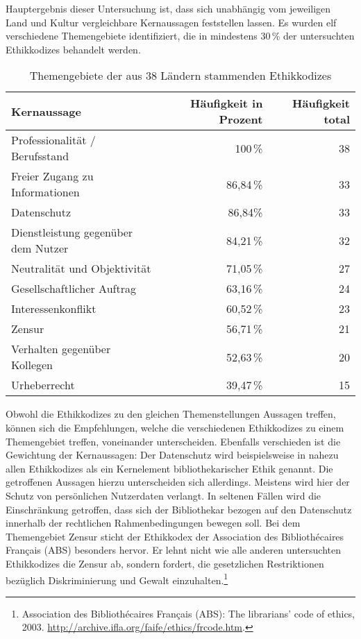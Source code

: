 \documentclass[output=paper]{langscibook}
\begin{document}
Hauptergebnis dieser Untersuchung ist, dass sich unabhängig vom
jeweiligen Land und Kultur vergleichbare Kernaussagen feststellen
lassen. Es wurden elf verschiedene Themengebiete identifiziert, die in
mindestens 30\,\% der untersuchten Ethikkodizes behandelt werden.



\begin{table}[htp!]
\centering
\begin{tabularx}{\textwidth}{@{} X r r @{}}
\toprule
\textbf{Kernaussage}  & \textbf{Häufigkeit in Prozent}  & \textbf{Häufigkeit total} \\
\midrule
Professionalität / Berufsstand & 100\,\% & 38 \\
\midrule
Freier Zugang zu Informationen & 86,84\,\% & 33 \\
\midrule
Datenschutz & 86,84\% & 33 \\
\midrule
Dienstleistung gegenüber dem Nutzer & 84,21\,\% & 32 \\
\midrule
Neutralität und Objektivität & 71,05\,\% & 27 \\
\midrule
Gesellschaftlicher Auftrag & 63,16\,\% & 24 \\
\midrule
Interessenkonflikt & 60,52\,\% & 23 \\
\midrule
Zensur & 56,71\,\% & 21 \\
\midrule
Verhalten gegenüber Kollegen & 52,63\,\% & 20 \\
\midrule
Urheberrecht & 39,47\,\% & 15 \\
\bottomrule
\end{tabularx}
\caption{Themengebiete der aus 38 Ländern stammenden Ethikkodizes}
\end{table}

Obwohl die Ethikkodizes zu den gleichen Themenstellungen Aussagen
treffen, können sich die Empfehlungen, welche die verschiedenen
Ethikkodizes zu einem Themengebiet treffen, voneinander unterscheiden.
Ebenfalls verschieden ist die Gewichtung der Kernaussagen: Der
Datenschutz wird beispielsweise in nahezu allen Ethikkodizes als ein
Kernelement bibliothekarischer Ethik genannt. Die getroffenen Aussagen
hierzu unterscheiden sich allerdings. Meistens wird hier der Schutz von
persönlichen Nutzerdaten verlangt. In seltenen Fällen wird die
Einschränkung getroffen, dass sich der Bibliothekar bezogen auf den
Datenschutz innerhalb der rechtlichen Rahmenbedingungen bewegen soll.
Bei dem Themengebiet Zensur sticht der Ethikkodex der Association des
Bibliothécaires Français (ABS) besonders hervor. Er lehnt nicht wie alle
anderen untersuchten Ethikkodizes die Zensur ab, sondern fordert, die
gesetzlichen Restriktionen bezüglich Diskriminierung und Gewalt
einzuhalten.\footnote{Association des Bibliothécaires Français (ABS):
  The librarians' code of ethics, 2003.
  \url{http://archive.ifla.org/faife/ethics/frcode.htm}.}
\end{document}
